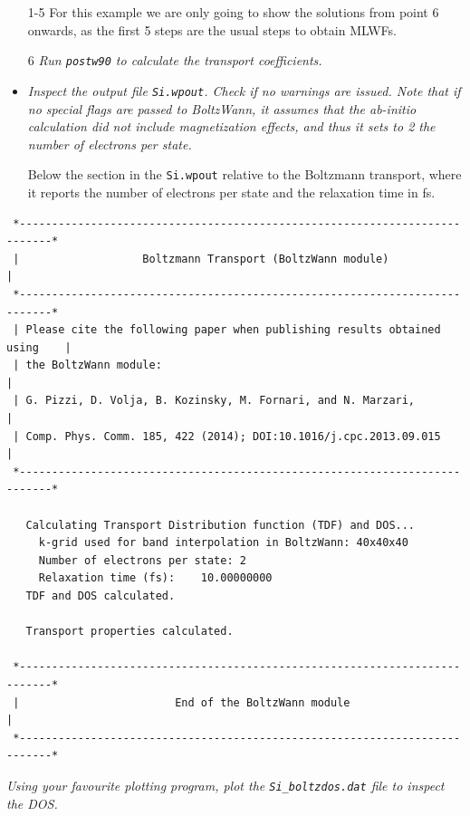 \begin{itemize}
	\item[1-5] For this example we are only going to show the solutions from point 6 onwards, as the first 5 steps are the usual steps to obtain MLWFs.
	\item[6] {\it Run {\tt postw90} to calculate the transport coefficients.}
	\item {\it Inspect the output file {\tt Si.wpout}. Check if no warnings are issued. Note that if no special flags are passed to {\sc BoltzWann}, it assumes that the ab-initio calculation did not include magnetization effects, and thus it sets to 2 the number of electrons per state.}

Below the section in the {\tt Si.wpout} relative to the Boltzmann transport, where it reports the number of electrons per state and the relaxation time in fs.
\end{itemize}
\begin{tcolorbox}[sharp corners,boxrule=0.5pt]
{\small
\begin{verbatim}
 *---------------------------------------------------------------------------*
 |                   Boltzmann Transport (BoltzWann module)                  |
 *---------------------------------------------------------------------------*
 | Please cite the following paper when publishing results obtained using    |
 | the BoltzWann module:                                                     |
 | G. Pizzi, D. Volja, B. Kozinsky, M. Fornari, and N. Marzari,              |
 | Comp. Phys. Comm. 185, 422 (2014); DOI:10.1016/j.cpc.2013.09.015          |
 *---------------------------------------------------------------------------*

   Calculating Transport Distribution function (TDF) and DOS...
     k-grid used for band interpolation in BoltzWann: 40x40x40
     Number of electrons per state: 2
     Relaxation time (fs):    10.00000000     
   TDF and DOS calculated.

   Transport properties calculated.

 *---------------------------------------------------------------------------*
 |                        End of the BoltzWann module                        |
 *---------------------------------------------------------------------------*
\end{verbatim}
}
\end{tcolorbox}  


{\it Using your favourite plotting program, plot the {\tt Si\_boltzdos.dat} file to inspect the DOS.}

